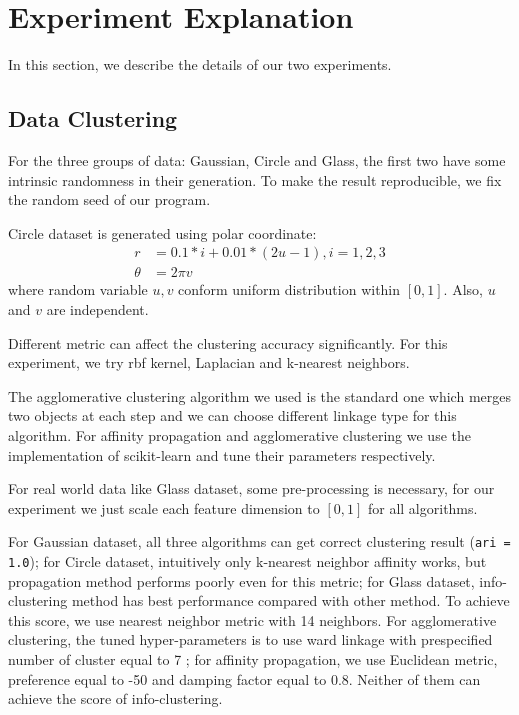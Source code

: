 \documentclass{article}
\begin{document}
\section{Experiment Explanation}
In this section, we describe the details of our two experiments. 

\subsection{Data Clustering}
For the three groups of data: \textsf{Gaussian}, \textsf{Circle} and \textsf{Glass}, the first two have some intrinsic randomness in their generation. To make the result reproducible, we fix the random seed of our program. 

\textsf{Circle} dataset is generated using polar coordinate:
\begin{align*}
r &= 0.1*i + 0.01*(2u-1), i = 1, 2, 3\\
\theta & = 2\pi v
\end{align*}
where random variable $u,v$ conform uniform distribution within $[0,1]$. Also, $u$ and $v$ are independent.

Different metric can affect the clustering accuracy significantly. For this experiment, we try rbf kernel, Laplacian and k-nearest neighbors.  

The agglomerative clustering algorithm we used is the standard one which merges two objects at each step and we can choose different linkage type for this algorithm. For \textsf{affinity propagation} and \textsf{agglomerative clustering} we use the implementation of \textsf{scikit-learn} \cite{scikit-learn} and tune their parameters respectively.

For real world data like Glass dataset, some pre-processing is necessary, for our experiment we just scale each feature dimension to $[0, 1]$ for all algorithms.

For \textsf{Gaussian} dataset, all three algorithms can get correct clustering result (\texttt{ari = 1.0}); for \textsf{Circle} dataset, intuitively only k-nearest neighbor affinity works, but propagation method performs poorly even for this metric; for \textsf{Glass} dataset, info-clustering method has best performance compared with other method. To achieve this score, we use nearest neighbor metric with 14 neighbors. For agglomerative clustering, the tuned hyper-parameters is to use ward linkage with prespecified number of cluster equal to 7 ; for affinity propagation, we use Euclidean metric, preference equal to -50 and damping factor equal to 0.8. Neither of them can achieve the score of info-clustering.
\end{document}
